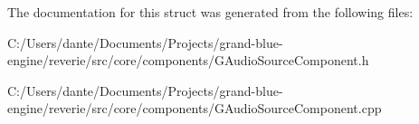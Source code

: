The documentation for this struct was generated from the following files\+:\begin{DoxyCompactItemize}
\item 
C\+:/\+Users/dante/\+Documents/\+Projects/grand-\/blue-\/engine/reverie/src/core/components/G\+Audio\+Source\+Component.\+h\item 
C\+:/\+Users/dante/\+Documents/\+Projects/grand-\/blue-\/engine/reverie/src/core/components/G\+Audio\+Source\+Component.\+cpp\end{DoxyCompactItemize}
